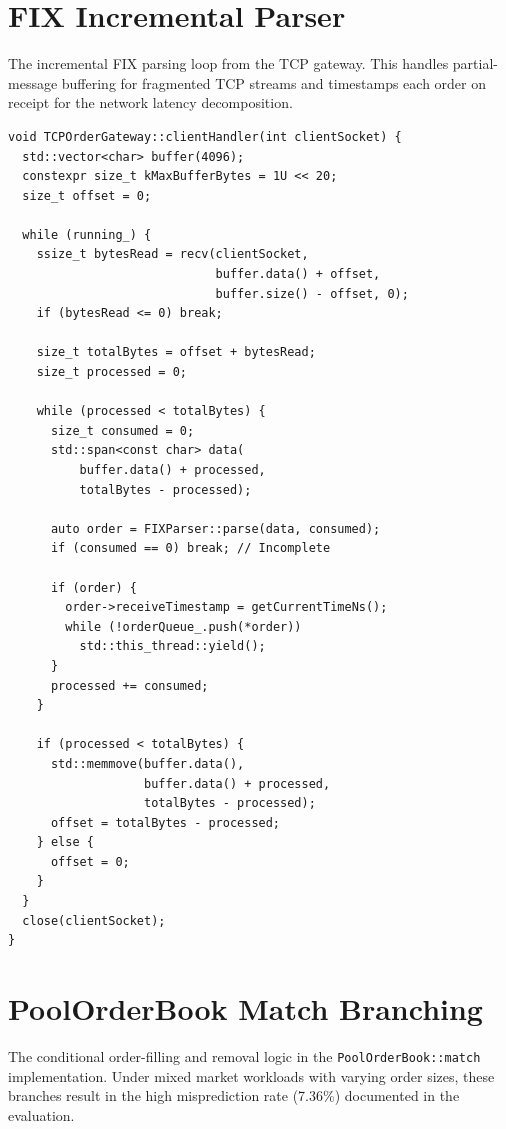 \documentclass[12pt,a4paper]{report}
\begin{document}
\chapter{FIX Incremental Parser}
The incremental FIX parsing loop from the TCP gateway. This handles partial-message buffering for fragmented TCP streams and timestamps each order on receipt for the network latency decomposition.

\begin{lstlisting}[caption={Incremental FIX Parsing (src/network/tcp\_order\_gateway.cpp)}]
void TCPOrderGateway::clientHandler(int clientSocket) {
  std::vector<char> buffer(4096);
  constexpr size_t kMaxBufferBytes = 1U << 20;
  size_t offset = 0;

  while (running_) {
    ssize_t bytesRead = recv(clientSocket,
                             buffer.data() + offset,
                             buffer.size() - offset, 0);
    if (bytesRead <= 0) break;

    size_t totalBytes = offset + bytesRead;
    size_t processed = 0;

    while (processed < totalBytes) {
      size_t consumed = 0;
      std::span<const char> data(
          buffer.data() + processed,
          totalBytes - processed);

      auto order = FIXParser::parse(data, consumed);
      if (consumed == 0) break; // Incomplete

      if (order) {
        order->receiveTimestamp = getCurrentTimeNs();
        while (!orderQueue_.push(*order))
          std::this_thread::yield();
      }
      processed += consumed;
    }

    if (processed < totalBytes) {
      std::memmove(buffer.data(),
                   buffer.data() + processed,
                   totalBytes - processed);
      offset = totalBytes - processed;
    } else {
      offset = 0;
    }
  }
  close(clientSocket);
}
\end{lstlisting}

\chapter{PoolOrderBook Match Branching}
\label{app:pool_branching}
The conditional order-filling and removal logic in the \texttt{PoolOrderBook::match} implementation. Under mixed market workloads with varying order sizes, these branches result in the high misprediction rate (7.36\%) documented in the evaluation.
\end{document}
